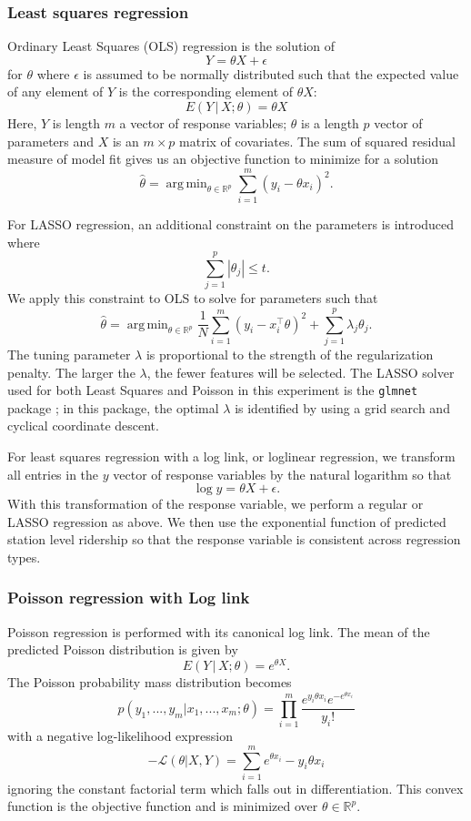 \documentclass[11pt]{article}
\DeclareMathOperator*{\argmin}{arg\,min}
\begin{document}
\subsubsection{Least squares regression}\label{sec:ols}

Ordinary Least Squares (OLS) regression is the solution of 
\[Y = \theta X + \epsilon\] for $\theta$ where $\epsilon$ is assumed to be normally distributed such that the expected value of any element of $Y$ is the corresponding element of $\theta X$:
\[E(Y\,|\,X; \theta) = \theta X\]
Here, $Y$ is length $m$ a vector of response variables; $\theta$ is a length $p$ vector of parameters and $X$ is an $m\times p$ matrix of covariates. The sum of squared residual measure of model fit gives us an objective function to minimize for a solution
\[\hat{\theta} = \argmin_{\theta\in\mathbb{R}^p}\sum_{i=1}^m \left(y_i - \theta x_i\right)^2.\]

For LASSO regression, an additional constraint on the parameters is introduced where 
\[\sum_{j=1}^p |\theta_j|\leq t.\] We apply this constraint to OLS to solve for parameters such that
\[\hat{\theta} = \argmin_{\theta\in\mathbb{R}^p} \frac{1}{N}\sum_{i=1}^m \left(y_i - x_i^\top\theta\right)^2 + \sum_{j=1}^p\lambda_j\theta_j.\]
The tuning parameter $\lambda$ is proportional to the strength of the regularization penalty. The larger the $\lambda$, the fewer features will be selected. The LASSO solver used for both Least Squares and Poisson in this experiment is the \texttt{glmnet} package \cite{glmnet}; in this package, the optimal $\lambda$ is identified by using a grid search and cyclical coordinate descent.  

For least squares regression with a log link, or loglinear regression, we transform all entries in the $y$ vector of response variables by the natural logarithm so that 
$$\log{y} = \theta X + \epsilon.$$
With this transformation of the response variable, we perform a regular or LASSO regression as above. We then use the exponential function of predicted station level ridership so that the response variable is consistent across regression types.

\subsubsection{Poisson regression with Log link}

Poisson regression is performed with its canonical log link. The mean of the predicted Poisson distribution is given by 
\[E(Y\,|\,X;\theta) = e^{\theta X}.\]
The Poisson probability mass distribution becomes
\[p(y_1, ..., y_m|x_1, ..., x_m; \theta) = \prod_{i=1}^m \frac{e^{y_i\theta x_i}e^{-e^{\theta x_i}}}{y_i!}\]
with a negative log-likelihood expression
\[-\mathcal{L}(\theta|X, Y) = \sum_{i=1}^m e^{\theta x_i}-y_i\theta x_i \]
ignoring the constant factorial term which falls out in differentiation. This convex function is the objective function and is minimized over $\theta\in\mathbb{R}^p$.
\end{document}
